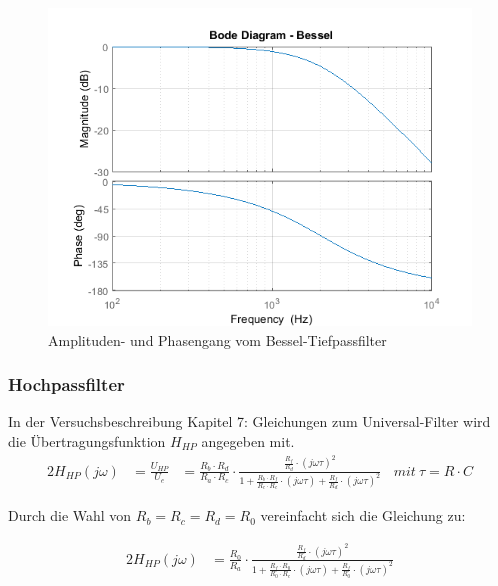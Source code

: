 \newpage

\begin{figure}[h]
\centering
\includegraphics[width=0.9\linewidth]{Bilder/TP_Bessel}
\caption{Amplituden- und Phasengang vom Bessel-Tiefpassfilter}
\label{fig:TP_Bessel}
\end{figure}

\newpage


\subsubsection{Hochpassfilter}

In der Versuchsbeschreibung Kapitel 7: Gleichungen zum Universal-Filter wird die Übertragungsfunktion $H_{HP}$ angegeben mit.\\

\begin{alignat}{2}
H_{HP} (j \omega)&= \frac{U_{HP}}{U_{e}} &= \frac{R_{b} \cdot R_{d}}{R_{a} \cdot R_{c}} \cdot \frac{ \frac{R_{f} }{R_{d}} \cdot \left( j \omega \tau \right)^2 }{1+\frac{R_{b} \cdot R_{f}}{R_{c} \cdot R_{e}} \cdot  \left(j \omega \tau \right) + \frac{R_{f}}{R_{d}} \cdot \left ( j \omega \tau \right)^2}~~~~ mit ~\tau = R \cdot C
\end{alignat}

\noindent Durch die Wahl von $R_{b} = R_{c} = R_{d} = R_{0}$ vereinfacht sich die Gleichung zu:

\begin{alignat}{2}
H_{HP} (j \omega) &= \frac{R_{0}}{R_{a}} \cdot \frac{ 	\frac{R_{f} }{R_{d}} \cdot \left( j \omega \tau \right)^2 }	 {1+\frac{R_{f} \cdot R_{0}}{R_{0} \cdot R_{e}} \cdot  \left(j \omega \tau \right) + \frac{R_{f}}{R_{0}} \cdot \left ( j \omega \tau \right)^2}
\end{alignat}

